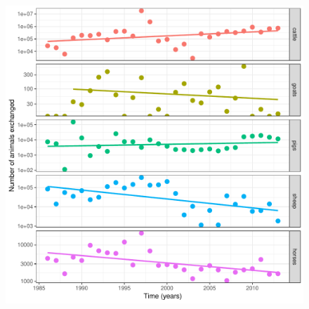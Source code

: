 \documentclass[a4paper,10pt]{article}
\begin{document}
\begin{center}
\begin{figure}[H]
\begin{center}
\end{center}
\caption{}
\label{sfig:tradenets}
\end{figure}
\end{center}
\newpage
\begin{center}
\begin{figure}[H]
\begin{center}
\includegraphics[scale=.80]{FIGURES/PLOTS/trade_through_time.pdf}
\end{center}
\caption{}
\label{sfig:trade_temporal}
\end{figure}
\end{center}
\end{document}
